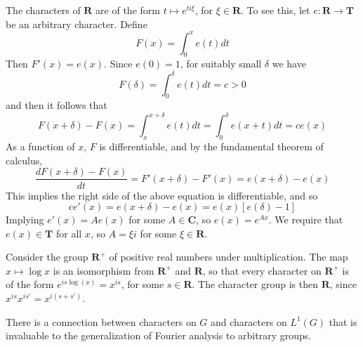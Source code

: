 \begin{example}
    The characters of $\mathbf{R}$ are of the form $t \mapsto e^{ti\xi}$, for $\xi \in \mathbf{R}$. To see this, let $e: \mathbf{R} \to \mathbf{T}$ be an arbitrary character. Define
    \[ F(x) = \int_0^x e(t) dt \]
    Then $F'(x) = e(x)$. Since $e(0) = 1$, for suitably small $\delta$ we have
    \[ F(\delta) = \int_0^\delta e(t) dt = c > 0 \]
    and then it follows that
    \[ F(x + \delta) - F(x) = \int_x^{x + \delta} e(t) dt = \int_0^\delta e(x + t) dt = c e(x) \]
    As a function of $x$, $F$ is differentiable, and by the fundamental theorem of calculus,
    \[ \frac{dF(x + \delta) - F(x)}{dt} = F'(x + \delta) - F'(x) = e(x + \delta) - e(x) \]
    This implies the right side of the above equation is differentiable, and so
    \[ ce'(x) = e(x + \delta) - e(x) = e(x) [e(\delta) - 1] \]
    Implying $e'(x) = A e(x)$ for some $A \in \mathbf{C}$, so $e(x) = e^{Ax}$. We require that $e(x) \in \mathbf{T}$ for all $x$, so $A = \xi i$ for some $\xi \in \mathbf{R}$.
\end{example}

\begin{example}
    Consider the group $\mathbf{R}^+$ of positive real numbers under multiplication. The map $x \mapsto \log x$ is an isomorphism from $\mathbf{R}^+$ and $\mathbf{R}$, so that every character on $\mathbf{R}^+$ is of the form $e^{is \log(x)} = x^{is}$, for some $s \in \mathbf{R}$. The character group is then $\mathbf{R}$, since $x^{is} x^{is'} = x^{i(s + s')}$.
\end{example}

There is a connection between characters on $G$ and characters on $L^1(G)$ that is invaluable to the generalization of Fourier analysis to arbitrary groups.

